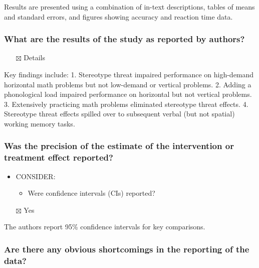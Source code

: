 \documentclass[
  doc, a4paper]{apa7}
\providecommand{\tightlist}{%
  \setlength{\itemsep}{0pt}\setlength{\parskip}{0pt}}
\begin{document}
Results are presented using a combination of in-text descriptions, tables of means and standard errors, and figures showing accuracy and reaction time data.

\subsubsection{What are the results of the study as reported by authors?}\label{what-are-the-results-of-the-study-as-reported-by-authors}

\begin{itemize}
\tightlist
\item[$\boxtimes$]
  Details
\end{itemize}

Key findings include:
1. Stereotype threat impaired performance on high-demand horizontal math problems but not low-demand or vertical problems.
2. Adding a phonological load impaired performance on horizontal but not vertical problems.
3. Extensively practicing math problems eliminated stereotype threat effects.
4. Stereotype threat effects spilled over to subsequent verbal (but not spatial) working memory tasks.

\subsubsection{Was the precision of the estimate of the intervention or treatment effect reported?}\label{was-the-precision-of-the-estimate-of-the-intervention-or-treatment-effect-reported}

\begin{itemize}
\tightlist
\item
  CONSIDER:

  \begin{itemize}
  \tightlist
  \item
    Were confidence intervals (CIs) reported?
  \end{itemize}
\item[$\boxtimes$]
  Yes
\end{itemize}

The authors report 95\% confidence intervals for key comparisons.

\subsubsection{Are there any obvious shortcomings in the reporting of the data?}\label{are-there-any-obvious-shortcomings-in-the-reporting-of-the-data}
\end{document}
